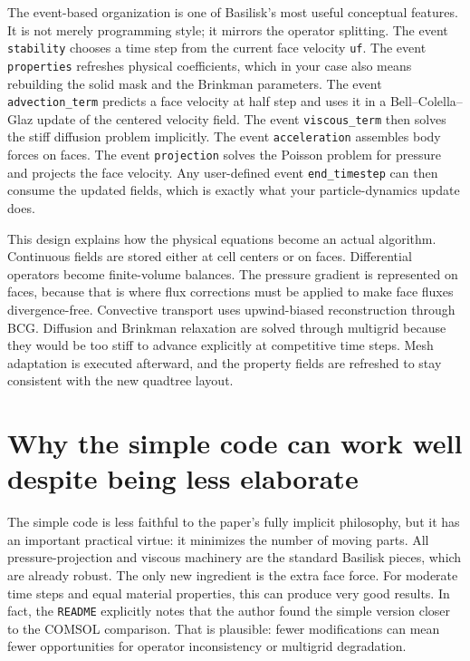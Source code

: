\documentclass[11pt,a4paper]{article}
\begin{document}
The event-based organization is one of Basilisk's most useful conceptual features. It is not merely programming style; it mirrors the operator splitting. The event \texttt{stability} chooses a time step from the current face velocity \texttt{uf}. The event \texttt{properties} refreshes physical coefficients, which in your case also means rebuilding the solid mask and the Brinkman parameters. The event \texttt{advection\_term} predicts a face velocity at half step and uses it in a Bell--Colella--Glaz update of the centered velocity field. The event \texttt{viscous\_term} then solves the stiff diffusion problem implicitly. The event \texttt{acceleration} assembles body forces on faces. The event \texttt{projection} solves the Poisson problem for pressure and projects the face velocity. Any user-defined event \texttt{end\_timestep} can then consume the updated fields, which is exactly what your particle-dynamics update does.

This design explains how the physical equations become an actual algorithm. Continuous fields are stored either at cell centers or on faces. Differential operators become finite-volume balances. The pressure gradient is represented on faces, because that is where flux corrections must be applied to make face fluxes divergence-free. Convective transport uses upwind-biased reconstruction through BCG. Diffusion and Brinkman relaxation are solved through multigrid because they would be too stiff to advance explicitly at competitive time steps. Mesh adaptation is executed afterward, and the property fields are refreshed to stay consistent with the new quadtree layout.

\section{Why the simple code can work well despite being less elaborate}

The simple code is less faithful to the paper's fully implicit philosophy, but it has an important practical virtue: it minimizes the number of moving parts. All pressure-projection and viscous machinery are the standard Basilisk pieces, which are already robust. The only new ingredient is the extra face force. For moderate time steps and equal material properties, this can produce very good results. In fact, the \texttt{README} explicitly notes that the author found the simple version closer to the COMSOL comparison. That is plausible: fewer modifications can mean fewer opportunities for operator inconsistency or multigrid degradation.
\end{document}
